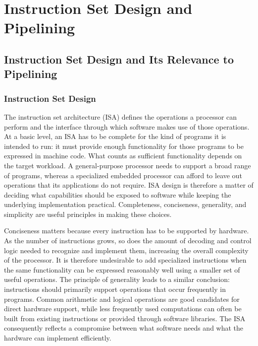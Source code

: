 \documentclass[11pt,a4paper]{report}
\begin{document}
\chapter{Instruction Set Design and Pipelining}
\label{ch:pipeline-basics}

\section{Instruction Set Design and Its Relevance to Pipelining}
\label{sec:isa-tradeoffs}

\subsection{Instruction Set Design}

The instruction set architecture (ISA) defines the operations a processor can perform and the interface through which software makes use of those operations. At a basic level, an ISA has to be complete for the kind of programs it is intended to run: it must provide enough functionality for those programs to be expressed in machine code. What counts as sufficient functionality depends on the target workload. A general-purpose processor needs to support a broad range of programs, whereas a specialized embedded processor can afford to leave out operations that its applications do not require. ISA design is therefore a matter of deciding what capabilities should be exposed to software while keeping the underlying implementation practical. Completeness, conciseness, generality, and simplicity are useful principles in making these choices.

Conciseness matters because every instruction has to be supported by hardware. As the number of instructions grows, so does the amount of decoding and control logic needed to recognize and implement them, increasing the overall complexity of the processor. It is therefore undesirable to add specialized instructions when the same functionality can be expressed reasonably well using a smaller set of useful operations. The principle of generality leads to a similar conclusion: instructions should primarily support operations that occur frequently in programs. Common arithmetic and logical operations are good candidates for direct hardware support, while less frequently used computations can often be built from existing instructions or provided through software libraries. The ISA consequently reflects a compromise between what software needs and what the hardware can implement efficiently.
\end{document}
